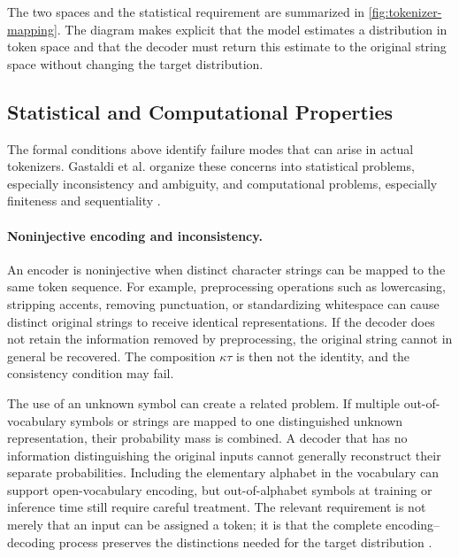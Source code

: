 The two spaces and the statistical requirement are summarized in \cref{fig:tokenizer-mapping}. The diagram makes explicit that the model estimates a distribution in token space and that the decoder must return this estimate to the original string space without changing the target distribution.



\subsection{Statistical and Computational Properties}
\label{subsec:tokenizer-statistical-computational-properties}

The formal conditions above identify failure modes that can arise in actual tokenizers. Gastaldi et al. organize these concerns into statistical problems, especially inconsistency and ambiguity, and computational problems, especially finiteness and sequentiality \parencite{gastaldi2025foundations}.

\paragraph{Noninjective encoding and inconsistency.}
An encoder is noninjective when distinct character strings can be mapped to the same token sequence. For example, preprocessing operations such as lowercasing, stripping accents, removing punctuation, or standardizing whitespace can cause distinct original strings to receive identical representations. If the decoder does not retain the information removed by preprocessing, the original string cannot in general be recovered. The composition \(\kappa\tau\) is then not the identity, and the consistency condition may fail.

The use of an unknown symbol can create a related problem. If multiple out-of-vocabulary symbols or strings are mapped to one distinguished unknown representation, their probability mass is combined. A decoder that has no information distinguishing the original inputs cannot generally reconstruct their separate probabilities. Including the elementary alphabet in the vocabulary can support open-vocabulary encoding, but out-of-alphabet symbols at training or inference time still require careful treatment. The relevant requirement is not merely that an input can be assigned a token; it is that the complete encoding--decoding process preserves the distinctions needed for the target distribution \parencite{gastaldi2025foundations}.

